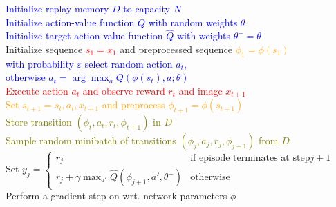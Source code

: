 \documentclass{standalone}
\begin{document}
\pagestyle{empty}
\begin{algorithm}[H]
  \textcolor{blue}{Initialize replay memory $D$ to capacity $N$\\
  Initialize action-value function $Q$ with random weights $\theta$\\
  Initialize target action-value function $\hat{Q}$ with weights $\theta^{-}=\theta$} \\
 {
  Initialize sequence \textcolor{red}{$s_1 = {x_1}$} and preprocessed sequence \textcolor{orange}{$\phi_1=\phi(s_1)$}\\
   {
  \textcolor{blue}{with probability $\varepsilon$ select random action $a_t$, \\
  	otherwise $a_t = \arg\max_{a} Q(\phi(s_t), a; \theta)$} \\
  \textcolor{red}{Execute action $a_t$ and observe reward $r_t$ and image $x_{t+1}$}\\
  \textcolor{orange}{Set $s_{t+1} = s_t, a_t, x_{t+1}$ and preprocess $\phi_{t+1} = \phi(s_{t+1})$}\\
  \textcolor{olive}{Store transition $(\phi_t,a_t ,r_t, \phi_{t+1})$ in $D$\\
  Sample random minibatch of transitions $(\phi_j,a_j ,r_j, \phi_{j+1})$ from $D$}\\
  Set $y_j = \begin{cases}
      r_j & \text{if episode terminates at step} j+1\\
      r_j + \gamma \max_{a'} \hat{Q}(\phi_{j+1}, a', \theta^{-}) & \text{otherwise}
    \end{cases} $ \\
  Perform a gradient step on wrt. network parameters $\phi$\\
  }
}
\end{algorithm}
\end{document}

